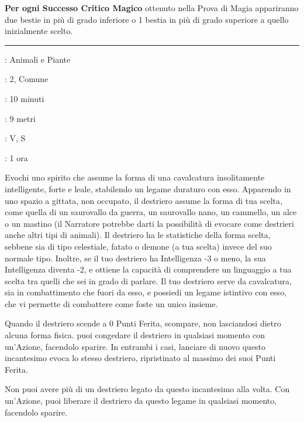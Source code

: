 \begin{multicols}{2}
\textbf{Per ogni Successo Critico Magico} ottenuto nella Prova di Magia appariranno due bestie in più di grado inferiore o 1 bestia in più di grado superiore a quello inizialmente scelto.

\smallskip\noindent\rule{\linewidth}{2pt} \hypertarget{Evoca Cavalcatura}{}\medskip{}
\noindent
\begin{description}[noitemsep, topsep=0pt, parsep=0pt, partopsep=0pt, leftmargin=0cm, labelwidth=2.8cm]
	\item[\textbf{Lista di Magia}]: Animali e Piante
	\item[\textbf{Livello}]: 2, Comune
	\item[\textbf{T. di Lancio}]: 10 minuti
	\item[\textbf{Gittata}]: 9 metri
	\item[\textbf{Componenti}]: V, S
	\item[\textbf{Durata}]: 1 ora
\end{description}

Evochi uno spirito che assume la forma di una cavalcatura insolitamente intelligente, forte e leale, stabilendo un legame duraturo con esso. Apparendo in uno spazio a gittata, non occupato, il destriero assume la forma di tua scelta, come quella di un saurovallo da guerra, un saurovallo nano, un cammello, un alce o un mastino (il Narratore potrebbe darti la possibilità di evocare come destrieri anche altri tipi di animali). Il destriero ha le statistiche della forma scelta, sebbene sia di tipo celestiale, fatato o demone (a tua scelta) invece del suo normale tipo. Inoltre, se il tuo destriero ha Intelligenza -3 o meno, la sua Intelligenza diventa -2, e ottiene la capacità di comprendere un linguaggio a tua scelta tra quelli che sei in grado di parlare. Il tuo destriero serve da cavalcatura, sia in combattimento che fuori da esso, e possiedi un legame istintivo con esso, che vi permette di combattere come foste un unico insieme.

Quando il destriero scende a 0 Punti Ferita, scompare, non lasciandosi dietro alcuna forma fisica. puoi congedare il destriero in qualsiasi momento con un'Azione, facendolo sparire. In entrambi i casi, lanciare di nuovo questo incantesimo evoca lo stesso destriero, ripristinato al massimo dei suoi Punti Ferita.

Non puoi avere più di un destriero legato da questo incantesimo alla volta. Con un'Azione, puoi liberare il destriero da questo legame in qualsiasi momento, facendolo sparire.


\end{multicols}
